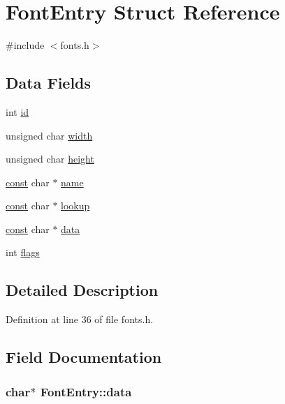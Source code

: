 \hypertarget{struct_font_entry}{\section{Font\-Entry Struct Reference}
\label{struct_font_entry}
}


{\ttfamily \#include $<$fonts.\-h$>$}

\subsection*{Data Fields}
\begin{DoxyCompactItemize}
\item 
int \hyperlink{struct_font_entry_aac1e71224e2b29501fd49cb55c286a8c}{id}
\item 
unsigned char \hyperlink{struct_font_entry_a56370306b33f87e74720552479ac8c4e}{width}
\item 
unsigned char \hyperlink{struct_font_entry_a681f3a165ad4cdebceacd154f1010496}{height}
\item 
\hyperlink{group___n_a_m_e_ga7ae6d0e43244213b34de2c2b9aa30da6}{const} char $\ast$ \hyperlink{struct_font_entry_ab835f13c463a408a4ed2a8a071b89933}{name}
\item 
\hyperlink{group___n_a_m_e_ga7ae6d0e43244213b34de2c2b9aa30da6}{const} char $\ast$ \hyperlink{struct_font_entry_ac5988218ea6cd3b134490c1426c8507f}{lookup}
\item 
\hyperlink{group___n_a_m_e_ga7ae6d0e43244213b34de2c2b9aa30da6}{const} char $\ast$ \hyperlink{struct_font_entry_a9dd857de897b7ca85befcfe5c162b418}{data}
\item 
int \hyperlink{struct_font_entry_ac303d26271189d7316a5be25645a015a}{flags}
\end{DoxyCompactItemize}


\subsection{Detailed Description}


Definition at line 36 of file fonts.\-h.



\subsection{Field Documentation}
\hypertarget{struct_font_entry_a9dd857de897b7ca85befcfe5c162b418}{
\subsubsection[{data}]{ char$\ast$ Font\-Entry\-::data}}\label{struct_font_entry_a9dd857de897b7ca85befcfe5c162b418}


